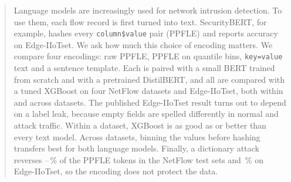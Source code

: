 \begin{abstract}
\noindent Language models are increasingly used for network intrusion detection. To use them, each flow record is
first turned into text. SecurityBERT, for example, hashes every \texttt{column\$value} pair (PPFLE) and reports
 accuracy on Edge-IIoTset. We ask how much this choice of encoding matters. We compare four
encodings: raw PPFLE, PPFLE on quantile bins, \texttt{key=value} text and a sentence template. Each is paired with a
small BERT trained from scratch and with a pretrained DistilBERT, and all are compared with a tuned XGBoost on four
NetFlow datasets and Edge-IIoTset, both within and across datasets. The published Edge-IIoTset result turns out to
depend on a label leak, because empty fields are spelled differently in normal and attack traffic. Within a dataset,
XGBoost is as good as or better than every text model. Across datasets, binning the values before hashing transfers
best for both language models. Finally, a dictionary attack reverses
--\,\% of the PPFLE tokens
in the NetFlow test sets and \,\% on
Edge-IIoTset, so the encoding does not protect the data.
\end{abstract}
